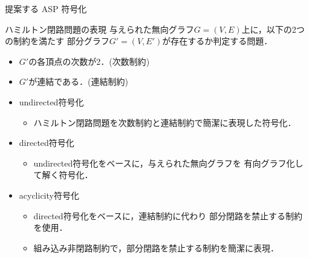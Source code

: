 \documentclass[dvipdfmx,11pt]{beamer}
\begin{document}
\begin{frame}{提案する ASP 符号化}
  \begin{block}{ハミルトン閉路問題の表現}
    与えられた無向グラフ$G= (V,E)$上に，以下の2つの制約を満たす
    部分グラフ$G'= (V,E')$が存在するか判定する問題．
    \begin{itemize}
    \item $G'$の各頂点の次数が2．(\alert{次数制約})
    \item $G'$が連結である．(\alert{連結制約})
    \end{itemize}
  \end{block}
  \begin{itemize}
  \item \alert{\textsf{undirected}符号化}
    \begin{itemize}
    \item ハミルトン閉路問題を次数制約と連結制約で簡潔に表現した符号化．
    \end{itemize}
  \item \alert{\textsf{directed}符号化}
    \begin{itemize}
    \item \textsf{undirected}符号化をベースに，与えられた無向グラフを
      有向グラフ化して解く符号化．
    \end{itemize}
  \item \alert{\textsf{acyclicity}符号化}
    \begin{itemize}
    \item \textsf{directed}符号化をベースに，連結制約に代わり
      部分閉路を禁止する制約を使用．
      \item 組み込み非閉路制約で，部分閉路を禁止する制約を簡潔に表現．
    \end{itemize}
  \end{itemize}
\end{frame}
\end{document}

